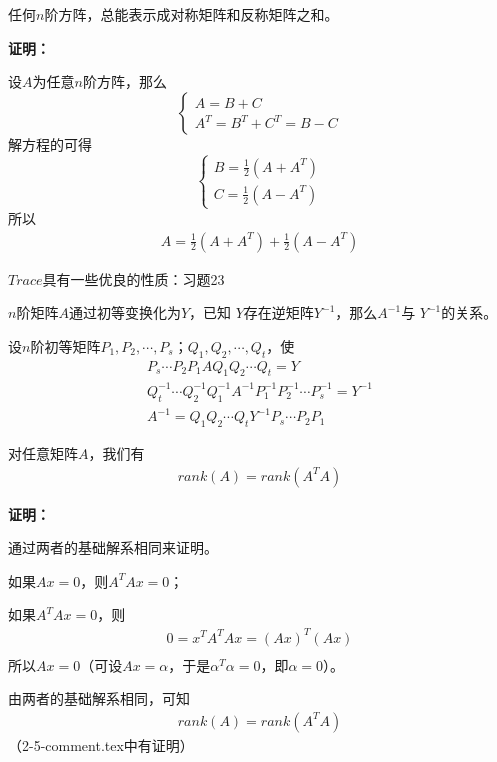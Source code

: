 \documentclass{article}
\begin{document}
\begin{zremark}
  任何$n$阶方阵，总能表示成对称矩阵和反称矩阵之和。
\end{zremark}

\textbf{证明：}

设$A$为任意$n$阶方阵，那么
\begin{equation*}
  \begin{cases*}
    A = B + C \\
    A^T = B^T + C^T = B - C
  \end{cases*}
\end{equation*}
解方程的可得
\begin{equation*}
  \begin{cases*}
    B = \frac{1}{2}(A + A^{T}) \\
    C = \frac{1}{2}(A - A^{T})
  \end{cases*}
\end{equation*}
所以
\begin{align*}
  A = \frac{1}{2}(A+A^{T}) + \frac{1}{2}(A-A^{T})
\end{align*}

\begin{zremark}
  $Trace$具有一些优良的性质：习题23
\end{zremark}

\begin{zremark}
  $n$阶矩阵$A$通过初等变换化为$Y$，已知
  $Y$存在逆矩阵$Y^{-1}$，那么$A^{-1}$与
  $Y^{-1}$的关系。
\end{zremark}

设$n$阶初等矩阵$P_1, P_2, \cdots, P_s$；$Q_1, Q_2, \cdots, Q_t$，使
\begin{align*}
  P_s \cdots P_2 P_1 A Q_1 Q_2 \cdots Q_t = Y                                         \\
  Q_t^{-1} \cdots Q_2^{-1} Q_1^{-1} A^{-1} P_1^{-1} P_2^{-1} \cdots P_s^{-1} = Y^{-1} \\
  A^{-1} = Q_1 Q_2 \cdots Q_t Y^{-1} P_s \cdots P_2P_1
\end{align*}

\begin{zremark}
  对任意矩阵$A$，我们有
  \begin{align*}
    rank(A) = rank(A^T A)
  \end{align*}
\end{zremark}

\textbf{证明：}

通过两者的基础解系相同来证明。

如果$Ax = 0$，则$A^T A x = 0$；

如果$A^T A x = 0$，则
\begin{align*}
  0 = x^T A^T A x = (A x)^T (A x) \\
\end{align*}
所以$Ax = 0$（可设$Ax = \alpha$，于是$\alpha^T \alpha = 0$，即$\alpha = 0$）。

由两者的基础解系相同，可知
\begin{align*}
  rank(A) = rank(A^T A)
\end{align*}
（2-5-comment.tex中有证明）
\end{document}
